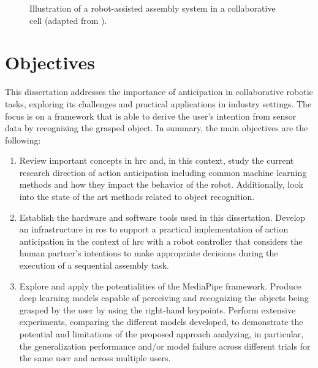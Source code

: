 \begin{figure}[ht]
    \captionsetup{width=0.7\textwidth}
    \centering
    {\fontsize{10}{12}\selectfont}
    \caption[Illustration of a robot-assisted assembly system in a collaborative cell.]{Illustration of a robot-assisted assembly system in a collaborative cell (adapted from \cite{Malik2020}).}
    \label{fig:ExperimentalSetup}
\end{figure}

\section{Objectives}

This dissertation addresses the importance of anticipation in collaborative robotic tasks, exploring its challenges and practical applications in industry settings. The focus is on a framework that is able to derive the user's intention from sensor data by recognizing the grasped object. %
In summary, the main objectives are the following:
\begin{enumerate}
    \item Review important concepts in \acs{hrc} and, in this context, study the current research direction of action anticipation including common machine learning methods and how they impact the behavior of the robot. Additionally, look into the state of the art methods related to object recognition.

    \item Establish the hardware and software tools used in this dissertation. Develop an infrastructure in \acs{ros} to support a practical implementation of action anticipation in the context of \acs{hrc} with a robot controller that considers the human partner's intentions to make appropriate decisions during the execution of a sequential assembly task.

    \item Explore and apply the potentialities of the MediaPipe framework. Produce deep learning models capable of perceiving and recognizing the objects being grasped by the user by using the right-hand keypoints. Perform extensive experiments, comparing the different models developed, to demonstrate the potential and limitations of the proposed approach analyzing, in particular, the generalization performance and/or model failure across different trials for the same user and across multiple users.
\end{enumerate}

